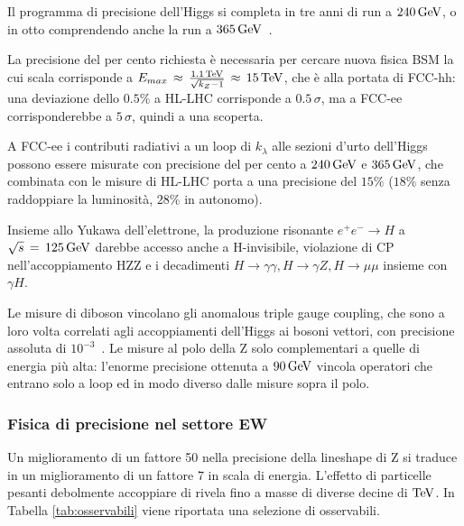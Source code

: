 Il programma di precisione dell'Higgs si completa in tre anni di run a $240\,\mathrm{GeV}$, o in otto comprendendo anche la run a $365\,\mathrm{GeV}$~\cite{FCC:FSR-v1}.

La precisione del per cento richiesta è necessaria per cercare nuova fisica BSM la cui scala corrisponde a $E_{max}\,\approx\,\frac{1.1\,\mathrm{TeV}}{\sqrt{k_Z-1}}\,\approx\,15\,\mathrm{TeV}$, che è alla portata di FCC-hh: una deviazione dello $0.5\%$ a HL-LHC corrisponde a $0.5\,\sigma$, ma a FCC-ee corrisponderebbe a $5\,\sigma$, quindi a una scoperta. 

A FCC-ee i contributi radiativi a un loop di $k_\lambda$ alle sezioni d'urto dell'Higgs possono essere misurate con precisione del per cento a $240\,\mathrm{GeV}$ e $365\,\mathrm{GeV}$, che combinata con le misure di HL-LHC porta a una precisione del $15\%$ ($18\%$ senza raddoppiare la luminosità, $28\%$ in autonomo). 

Insieme allo Yukawa dell'elettrone, la produzione risonante $e^+e^-\rightarrow H$ a $\sqrt{s}\,=\,125\,\mathrm{GeV}$ darebbe accesso anche a H-invisibile, violazione di CP nell'accoppiamento HZZ e i decadimenti $H\rightarrow\gamma\gamma, H\rightarrow\gamma Z, H\rightarrow\mu\mu$ insieme con $\gamma H$.

Le misure di diboson vincolano gli anomalous triple gauge coupling, che sono a loro volta correlati agli accoppiamenti dell'Higgs ai bosoni vettori, con precisione assoluta di $10^{-3}$~\cite{FCC:ESPPU-physics}. Le misure al polo della Z solo complementari a quelle di energia più alta: l'enorme precisione ottenuta a $90\,\mathrm{GeV}$ vincola operatori che entrano solo a loop ed in modo diverso dalle misure sopra il polo.

\subsubsection{Fisica di precisione nel settore EW}
Un miglioramento di un fattore 50 nella precisione della lineshape di Z si traduce in un miglioramento di un fattore 7 in scala di energia. L'effetto di particelle pesanti debolmente accoppiare di rivela fino a masse di diverse decine di $\mathrm{TeV}$. In Tabella \ref{tab:osservabili} viene riportata una selezione di osservabili.

